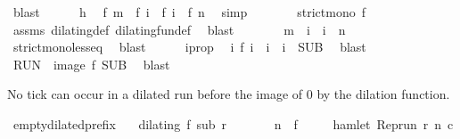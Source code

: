 \begin{isabellebody}
\ blast\isanewline
\ \ \ \ \isamarkupfalse%
\ h\ \isamarkupfalse%
\ {\isacartoucheopen}f\ m\ {\isasymle}\ f\ i\ {\isasymand}\ f\ i\ {\isasymle}\ f\ n{\isacartoucheclose}\ \isamarkupfalse%
\ simp\isanewline
\ \ \ \ \isamarkupfalse%
\ \isamarkupfalse%
\ {\isacartoucheopen}strict{\isacharunderscore}mono\ f{\isacartoucheclose}\ \isamarkupfalse%
\ assms\ dilating{\isacharunderscore}def\ dilating{\isacharunderscore}fun{\isacharunderscore}def\ \isamarkupfalse%
\ blast\isanewline
\ \ \ \ \isamarkupfalse%
\ \isamarkupfalse%
\ {\isacartoucheopen}m\ {\isasymle}\ i\ {\isasymand}\ i\ {\isasymle}\ n{\isacartoucheclose}\ \isamarkupfalse%
\ strict{\isacharunderscore}mono{\isacharunderscore}less{\isacharunderscore}eq\ \isamarkupfalse%
\ blast\isanewline
\ \ \ \ \isamarkupfalse%
\ i{}prop\ \isamarkupfalse%
\ {\isacartoucheopen}{\isasymexists}i\ f\ i\ {\isacharequal}\ i\ {\isasymand}\ i\ {\isasymin}\ {\isacharquery}SUB{\isacartoucheclose}\ \isamarkupfalse%
\ blast\isanewline
\ \ \isacommand{{\isacharbraceright}}\isamarkupfalse%
\ \isamarkupfalse%
\ {\isacartoucheopen}{\isacharquery}RUN\ {\isasymsubseteq}\ image\ f\ {\isacharquery}SUB{\isacartoucheclose}\ \isamarkupfalse%
\ blast\isanewline
{}\isamarkupfalse%
%
\endisatagproof
{\isafoldproof}%
%
\isadelimproof
%
\endisadelimproof
%
\begin{isamarkuptext}%
No tick can occur in a dilated run before the image of 0 by the dilation function.%
\end{isamarkuptext}\isamarkuptrue%
\isamarkupfalse%
\ empty{\isacharunderscore}dilated{\isacharunderscore}prefix{\isacharcolon}\isanewline
\ \ \ {\isacartoucheopen}dilating\ f\ sub\ r{\isacartoucheclose}\isanewline
\ \ \ \ \ \ \ {\isacartoucheopen}n\ {\isacharless}\ f\ {}{\isacartoucheclose}\isanewline
{}\ \ \ {\isacartoucheopen}{\isasymnot}\ hamlet\ {\isacharparenleft}{\isacharparenleft}Rep{\isacharunderscore}run\ r{\isacharparenright}\ n\ c{\isacharparenright}{\isacartoucheclose}\isanewline
%
\isadelimproof
%
\endisadelimproof
%
\isatagproof
{}\isamarkupfalse%

\end{isabellebody}
